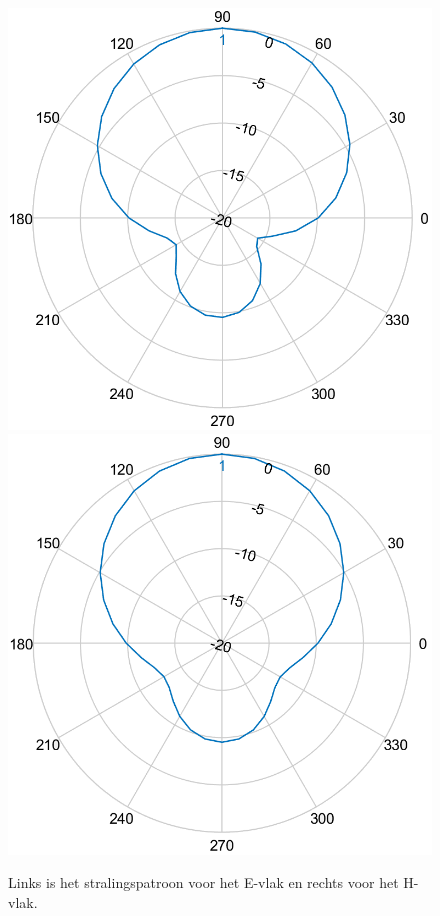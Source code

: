 \documentclass[twocolumn]{phdsymp} %
\begin{document}
\begin{figure}[!htb]
  \includegraphics[width=\linewidth]{pattern2/ep.png} 
\endminipage\hfill
{}%
  \includegraphics[width=\linewidth]{pattern2/hp.png}
\endminipage
  \caption{Links is het stralingspatroon voor het E-vlak en rechts voor het H-vlak.}
\label{fig:radpattern}
\end{figure}
\end{document}
